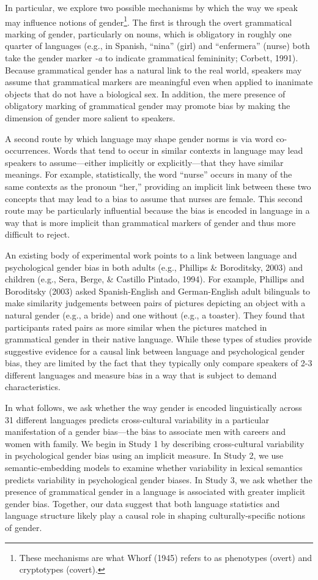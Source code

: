 \documentclass[man]{apa6}
\let\rmarkdownfootnote\footnote%
\def\footnote{\protect\rmarkdownfootnote}
\theoremstyle{definition}
\theoremstyle{definition}
\theoremstyle{definition}
\theoremstyle{remark}
\begin{document}
In particular, we explore two possible mechanisms by which the way we
speak may influence notions of
gender\footnote{These mechanisms are what Whorf (1945) refers to as phenotypes (overt) and cryptotypes (covert).}.
The first is through the overt grammatical marking of gender,
particularly on nouns, which is obligatory in roughly one quarter of
languages (e.g., in Spanish, ``nina'' (girl) and ``enfermera'' (nurse)
both take the gender marker \emph{-a} to indicate grammatical
femininity; Corbett, 1991). Because grammatical gender has a natural
link to the real world, speakers may assume that grammatical markers are
meaningful even when applied to inanimate objects that do not have a
biological sex. In addition, the mere presence of obligatory marking of
grammatical gender may promote bias by making the dimension of gender
more salient to speakers.

A second route by which language may shape gender norms is via word
co-occurrences. Words that tend to occur in similar contexts in language
may lead speakers to assume---either implicitly or explicitly---that
they have similar meanings. For example, statistically, the word
\enquote{nurse} occurs in many of the same contexts as the pronoun
\enquote{her,} providing an implicit link between these two concepts
that may lead to a bias to assume that nurses are female. This second
route may be particularly influential because the bias is encoded in
language in a way that is more implicit than grammatical markers of
gender and thus more difficult to reject.

An existing body of experimental work points to a link between language
and psychological gender bias in both adults (e.g., Phillips \&
Boroditsky, 2003) and children (e.g., Sera, Berge, \& Castillo Pintado,
1994). For example, Phillips and Boroditsky (2003) asked Spanish-English
and German-English adult bilinguals to make similarity judgements
between pairs of pictures depicting an object with a natural gender
(e.g., a bride) and one without (e.g., a toaster). They found that
participants rated pairs as more similar when the pictures matched in
grammatical gender in their native language. While these types of
studies provide suggestive evidence for a causal link between language
and psychological gender bias, they are limited by the fact that they
typically only compare speakers of 2-3 different languages and measure
bias in a way that is subject to demand characteristics.

In what follows, we ask whether the way gender is encoded linguistically
across 31 different languages predicts cross-cultural variability in a
particular manifestation of a gender bias---the bias to associate men
with careers and women with family. We begin in Study 1 by describing
cross-cultural variability in psychological gender bias using an
implicit measure. In Study 2, we use semantic-embedding models to
examine whether variability in lexical semantics predicts variability in
psychological gender biases. In Study 3, we ask whether the presence of
grammatical gender in a language is associated with greater implicit
gender bias. Together, our data suggest that both language statistics
and language structure likely play a causal role in shaping
culturally-specific notions of gender.
\end{document}
